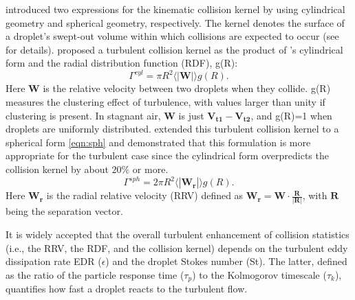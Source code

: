 \citet{Saffman1956} introduced two expressions for the kinematic collision kernel by using cylindrical geometry and spherical geometry, respectively. The kernel denotes the surface of a droplet's swept-out volume within which collisions are expected to occur (see \citet{Wang1998b} for details). \citet{Sundaram1997} proposed a turbulent collision kernel as the product of \citet{Saffman1956}'s cylindrical form and the radial distribution function (RDF), g(R):
\begin{equation}
\Gamma ^{cyl}=\pi R^2 \langle|\mathbf{W}|\rangle g(R). \label{eqn:cyl}
\end{equation}
Here $\mathbf{W}$ is the relative velocity between two droplets when they collide. g(R) measures the clustering effect of turbulence, with values larger than unity if clustering is present. In stagnant air, $\mathbf{W}$ is just $\mathbf{V_{t1}}-\mathbf{V_{t2}}$, and g(R)=1 when droplets are uniformly distributed. \citet{Wang1998b} extended this turbulent collision kernel to a spherical form \eqref{eqn:sph} and demonstrated that this formulation is more appropriate for the turbulent case since the cylindrical form overpredicts the collision kernel by about $20\%$ or more.
\begin{equation}
\Gamma^{sph}=2\pi R^2 \langle|\mathbf{W_r}|\rangle g(R). \label{eqn:sph}
\end{equation}
Here $\mathbf{W_r}$ is the radial relative velocity (RRV) defined as $\mathbf{W_r} = \mathbf{W}\cdot \frac{\mathbf{R}}{|\mathbf{R}|}$, with $\mathbf{R}$ being the separation vector. 

It is widely accepted that the overall turbulent enhancement of collision statistics (i.e., the RRV, the RDF, and the collision kernel) depends on the turbulent eddy dissipation rate EDR ($\epsilon$) and the droplet Stokes number (St). The latter, defined as the ratio of the particle response time ($\tau_p$) to the Kolmogorov timescale ($\tau_k$), quantifies how fast a droplet reacts to the turbulent flow.

